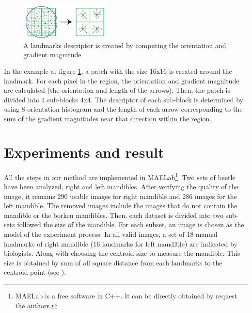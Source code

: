 \documentclass[twoside,twocolumn,10pt]{article}
\begin{document}
\begin{figure}[htb]
    \centering
    \includegraphics[width=0.4\textwidth]{./images/keypoint_descriptor}
    \caption{A landmarks descriptor is created by computing the orientation and gradient magnitude}
    \label{fig:kpdescriptor}
\end{figure}

In the example at figure \ref{fig:kpdescriptor}, a patch with the size 16x16 is created around the landmark. For each pixel in the region, the orientation and gradient magnitude are calculated (the orientation and length of the arrows). Then, the patch is divided into 4 sub-blocks 4x4. The descriptor of each sub-block is determined by using 8-orientation histogram and the length of each arrow corresponding to the sum of the gradient magnitudes near that direction within the region.\\

\section{Experiments and result}
All the steps in our method are implemented in MAELab\footnote{MAELab
  is a free software in C++. It can be directly obtained by request
  the authors.}. Two sets of beetle have been analyzed, right and left
mandibles. After verifying the quality of the image, it remains 290
usable images for right mandible and 286 images for the left mandible. The
removed images include the images that do not contain the mandible or
the borken mandibles. Then, each dataset is divided into two sub-sets followed the size of the mandible. For each subset, an image is chosen as the model of the experiment process. In all valid images, a set of 18 manual landmarks of right mandible (16 landmarks for left mandible) are indicated by biologists. Along with choosing the centroid size to measure the mandible. This size is obtained by sum of all square distance from each landmarks to the
centroid point (see \cite{web2010}).\\
\end{document}
